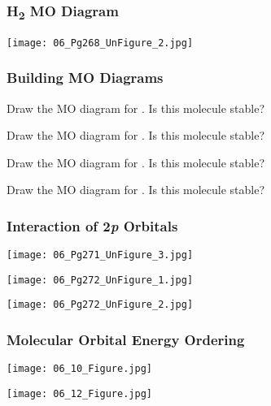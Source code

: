 \documentclass[handout]{beamer}
\begin{document}
\begin{frame}[c]
	\frametitle{H\textsubscript{2} MO Diagram}
	\begin{center}
		\texttt{[image: 06\_Pg268\_UnFigure\_2.jpg]}
	\end{center}
\end{frame}

\begin{frame}[t,allowframebreaks]
	\frametitle{Building MO Diagrams}
	Draw the MO diagram for . Is this molecule
	stable?

	\framebreak

	Draw the MO diagram for . Is this molecule
	stable?

	\framebreak

	Draw the MO diagram for . Is this molecule
	stable?

	\framebreak

	Draw the MO diagram for . Is this molecule
	stable?
\end{frame}

\clearpage

\begin{frame}[c,allowframebreaks]
	\frametitle{Interaction of 2\textit{p} Orbitals}
	\begin{center}
		\texttt{[image: 06\_Pg271\_UnFigure\_3.jpg]}
	\end{center}

	\framebreak

	\begin{center}
		\texttt{[image: 06\_Pg272\_UnFigure\_1.jpg]}
	\end{center}

	\framebreak

	\begin{center}
		\texttt{[image: 06\_Pg272\_UnFigure\_2.jpg]}
	\end{center}
\end{frame}

\begin{frame}[c,allowframebreaks]
	\frametitle{Molecular Orbital Energy Ordering}
	\begin{center}
		\texttt{[image: 06\_10\_Figure.jpg]}
	\end{center}

	\framebreak

	\begin{center}
		\texttt{[image: 06\_12\_Figure.jpg]}
	\end{center}
\end{frame}
\end{document}
